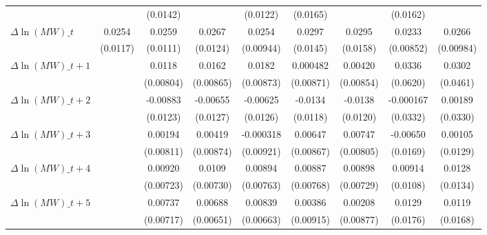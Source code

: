 {\begin{tabular}{l*{8}{c}}
          &                  & (0.0142)         &                  & (0.0122)         & (0.0165)         &                  & (0.0162)         &                  \\
[1em]
$\Delta \ln(MW)\_{t}$&   0.0254\sym{**} &   0.0259\sym{**} &   0.0267\sym{**} &   0.0254\sym{**} &   0.0297\sym{**} &   0.0295\sym{*}  &   0.0233\sym{***}&   0.0266\sym{**} \\
          & (0.0117)         & (0.0111)         & (0.0124)         &(0.00944)         & (0.0145)         & (0.0158)         &(0.00852)         &(0.00984)         \\
[1em]
$\Delta \ln(MW)\_{t+1}$&                  &   0.0118         &   0.0162\sym{*}  &   0.0182\sym{**} & 0.000482         &  0.00420         &   0.0336         &   0.0302         \\
          &                  &(0.00804)         &(0.00865)         &(0.00873)         &(0.00871)         &(0.00854)         & (0.0620)         & (0.0461)         \\
[1em]
$\Delta \ln(MW)\_{t+2}$&                  & -0.00883         & -0.00655         & -0.00625         &  -0.0134         &  -0.0138         &-0.000167         &  0.00189         \\
          &                  & (0.0123)         & (0.0127)         & (0.0126)         & (0.0118)         & (0.0120)         & (0.0332)         & (0.0330)         \\
[1em]
$\Delta \ln(MW)\_{t+3}$&                  &  0.00194         &  0.00419         &-0.000318         &  0.00647         &  0.00747         & -0.00650         &  0.00105         \\
          &                  &(0.00811)         &(0.00874)         &(0.00921)         &(0.00867)         &(0.00805)         & (0.0169)         & (0.0129)         \\
[1em]
$\Delta \ln(MW)\_{t+4}$&                  &  0.00920         &   0.0109         &  0.00894         &  0.00887         &  0.00898         &  0.00914         &   0.0128         \\
          &                  &(0.00723)         &(0.00730)         &(0.00763)         &(0.00768)         &(0.00729)         & (0.0108)         & (0.0134)         \\
[1em]
$\Delta \ln(MW)\_{t+5}$&                  &  0.00737         &  0.00688         &  0.00839         &  0.00386         &  0.00208         &   0.0129         &   0.0119         \\
          &                  &(0.00717)         &(0.00651)         &(0.00663)         &(0.00915)         &(0.00877)         & (0.0176)         & (0.0168)         \\

\end{tabular}}
